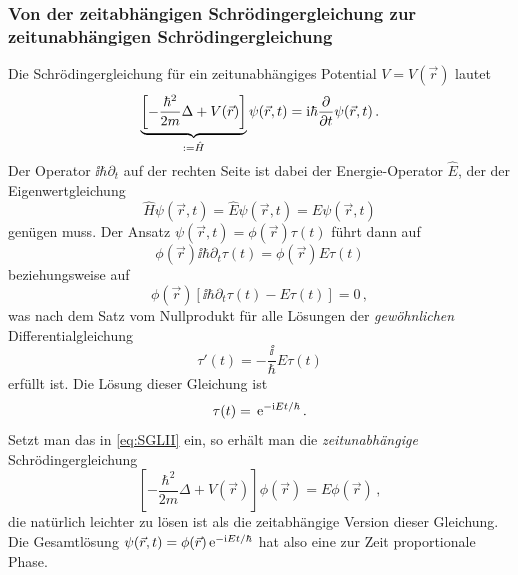 \documentclass[paper=a4, fontsize=11.0pt, abstractoff, DIV12]{scrartcl}
\begin{document}
\subsubsection{Von der zeitabhängigen Schrödingergleichung zur zeitunabhängigen Schrödingergleichung}

Die Schrödingergleichung für ein zeitunabhängiges Potential $V=V(\vec r)$ lautet
\begin{equation}
\underbrace{\left[-\frac{\hbar^2}{2m} \Delta + V(\vec r)\right]}_{:=\hat{H}}\psi(\vec r, t) = \ii \hbar\firstpderiv{}{t}\psi(\vec r, t)\,.
\label{eq:SGLII}
\end{equation}
Der Operator $\ii\hbar\partial_t$ auf der rechten Seite ist dabei der Energie-Operator $\hat{E}$, der der Eigenwertgleichung
\begin{equation}
\hat{H}\psi(\vec r, t) = \hat{E}\psi(\vec r, t) = E \psi(\vec r, t)
\end{equation}
genügen muss. Der Ansatz $\psi(\vec r, t) = \phi(\vec r)\tau(t)$ führt dann auf
\begin{equation*}
\phi(\vec r) \ii \hbar \partial_t \tau(t) = \phi(\vec r) E \tau(t)
\end{equation*}
beziehungsweise auf
\begin{equation}
\phi(\vec r) \left[\ii \hbar \partial_t \tau(t) - E \tau(t)\right]=0\,,
\end{equation}
was nach dem Satz vom Nullprodukt für alle Lösungen der \emph{gewöhnlichen}
Differentialgleichung
\begin{equation}
\tau'(t) = -\frac{\ii}{\hbar}E\tau(t)
\end{equation}
erfüllt ist. Die Lösung dieser Gleichung ist
\begin{equation}
\tau(t) = \,{\mathrm{e}}^{-\mathrm{i} E t/\hbar}\,.
\end{equation}
Setzt man das in \eqref{eq:SGLII} ein, so erhält man die \emph{zeitunabhängige} Schrödingergleichung
\begin{equation}
\left[-\frac{\hbar^2}{2m} \Delta + V(\vec r)\right] \phi(\vec r) = E\phi(\vec r)\,,
\end{equation}
die natürlich leichter zu lösen ist als die zeitabhängige Version dieser
Gleichung. Die Gesamtlösung $\psi(\vec r, t) = \phi(\vec r) \eto{-\ii E t/\hbar}$
hat also eine zur Zeit proportionale Phase.

\nocite{*}




\end{document}
